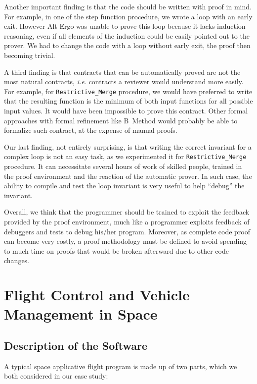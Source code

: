 \documentclass[10pt,a4paper,twocolumn]{article}
\newcommand{\altergo}{Alt-Ergo\xspace}
\newcommand{\ie}{\textit{i.e.}\xspace}
\newcommand{\SPARK}[1]{\lstinline[language=Ada,basicstyle={\footnotesize
      \sffamily},framesep=0pt]$#1$}
\begin{document}
Another important finding is that the code should be written with
proof in mind. For example, in one of the step function procedure, we
wrote a loop with an early exit. However \altergo was unable to prove
this loop because it lacks induction reasoning, even if all elements
of the induction could be easily pointed out to the prover. We had to
change the code with a loop without early exit, the proof then
becoming trivial.

A third finding is that contracts that can be automatically proved are
not the most natural contracts, \ie contracts a reviewer would
understand more easily. For example, for \SPARK{Restrictive_Merge}
procedure, we would have preferred to write that the resulting function
is the minimum of both input functions for all possible input
values. It would have been impossible to prove this contract. Other
formal approaches with formal refinement like B~Method would probably
be able to formalize such contract, at the expense of manual proofs.

Our last finding, not entirely surprising, is that writing the correct
invariant for a complex loop is not an easy task, as we experimented
it for \SPARK{Restrictive_Merge} procedure. It can necessitate several
hours of work of skilled people, trained in the proof environment and
the reaction of the automatic prover. In such case, the ability to
compile and test the loop invariant is very useful to help ``debug''
the invariant.

Overall, we think that the programmer should be trained to exploit the
feedback provided by the proof environment, much like a programmer
exploits feedback of debuggers and tests to debug his/her program.
Moreover, as complete code proof can become very costly, a proof
methodology must be defined to avoid spending to much time on proofs
that would be broken afterward due to other code changes.

\section{Flight Control and Vehicle Management in Space}

\subsection{Description of the Software}

A typical space applicative flight program is made up of two parts, which we
both considered in our case study:
\end{document}
